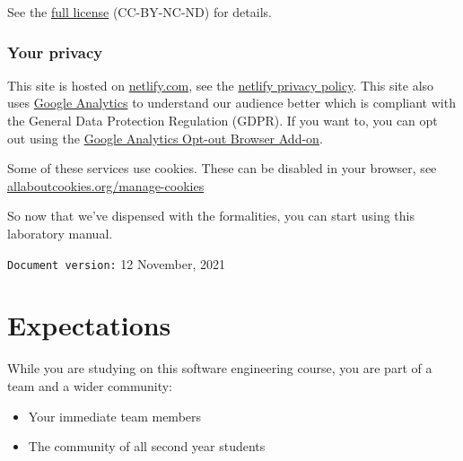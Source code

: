 \documentclass[
]{book}
\providecommand{\tightlist}{%
  \setlength{\itemsep}{0pt}\setlength{\parskip}{0pt}}
\begin{document}
See the \href{https://creativecommons.org/licenses/by-nc-nd/3.0/}{full license} (CC-BY-NC-ND) for details.

\hypertarget{privacy}{%
\subsection{Your privacy}\label{privacy}}

This site is hosted on \href{https://www.netlify.com/}{netlify.com}, see the \href{https://www.netlify.com/privacy/}{netlify privacy policy}. This site also uses \href{https://en.wikipedia.org/wiki/Google_Analytics}{Google Analytics} to understand our audience better which is compliant with the General Data Protection Regulation (GDPR). If you want to, you can opt out using the \href{https://tools.google.com/dlpage/gaoptout/}{Google Analytics Opt-out Browser Add-on}.

Some of these services use cookies. These can be disabled in your browser, see \href{https://www.allaboutcookies.org/manage-cookies/}{allaboutcookies.org/manage-cookies}

So now that we've dispensed with the formalities, you can start using this laboratory manual.





































\texttt{Document\ version:} 12 November, 2021

\hypertarget{expectations}{%
\chapter*{Expectations}\label{expectations}}

While you are studying on this software engineering course, you are part of a team and a wider community:

\begin{itemize}
\tightlist
\item
  Your immediate team members
\item
  The community of all second year students
\end{itemize}
\end{document}
